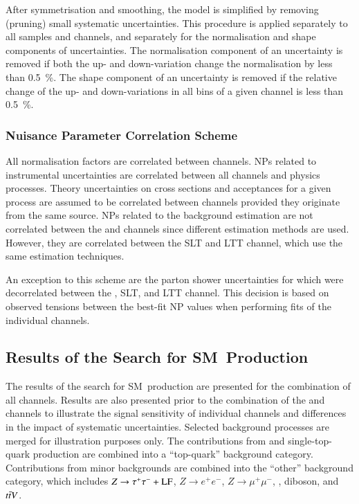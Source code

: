 After symmetrisation and smoothing, the model is simplified by removing
(pruning) small systematic uncertainties. This procedure is applied separately
to all samples and channels, and separately for the normalisation and shape
components of uncertainties. The normalisation component of an uncertainty is
removed if both the up- and down-variation change the normalisation by less than
\SI{0.5}{\percent}. The shape component of an uncertainty is removed if the
relative change of the up- and down-variations in all bins of a given channel is
less than \SI{0.5}{\percent}.


\subsubsection{Nuisance Parameter Correlation Scheme}

All normalisation factors are correlated between channels. NPs related to
instrumental uncertainties are correlated between all channels and physics
processes. Theory uncertainties on cross sections and acceptances for a given
process are assumed to be correlated between channels provided they originate
from the same source. NPs related to the \faketauhadvisC background estimation
are not correlated between the \hadhad and \lephad channels since different
estimation methods are used. However, they are correlated between the \lephad
SLT and LTT channel, which use the same estimation techniques.

An exception to this scheme are the parton shower uncertainties for \ttbar which
were decorrelated between the \hadhad, \lephad SLT, and \lephad LTT
channel. This decision is based on observed tensions between the best-fit NP
values when performing fits of the individual channels.



\subsection{Results of the Search for SM~\HH Production}%
\label{sec:results_nonres}

The results of the search for SM~\HH production are presented for the
combination of all channels. Results are also presented prior to the combination
of the \hadhad and \lephad channels to illustrate the signal sensitivity of
individual channels and differences in the impact of systematic uncertainties.
Selected background processes are merged for illustration purposes only. The
contributions from \ttbar and single-top-quark production are combined into a
``top-quark'' background category. Contributions from minor backgrounds are
combined into the ``other'' background category, which includes
$Z \to \tau^{+} \tau^{-} + \text{LF}$, $Z \to e^{+}e^{-}$, $Z \to \mu^{+}\mu^{-}$, \Wjets,
diboson, and $t\bar{t} V$.

